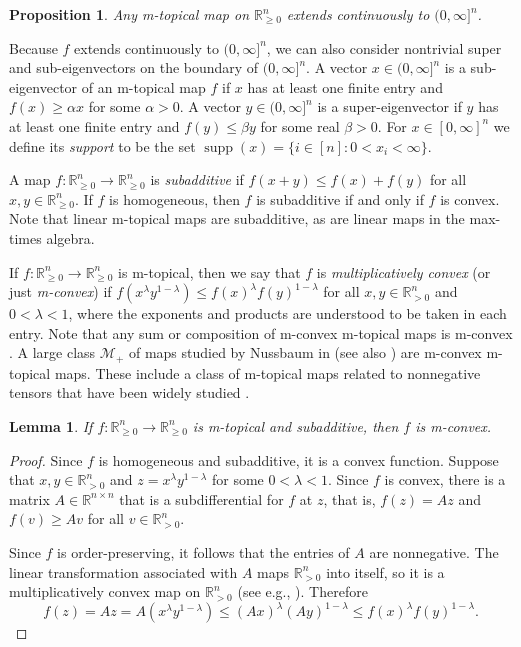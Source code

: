 \documentclass[10pt,reqno]{amsart}
\newcommand{\R}{\mathbb{R}}
\newcommand{\supp}{\operatorname{supp}}
\theoremstyle{plain}
\newtheorem{lemma}[theorem]{Lemma}
\newtheorem{proposition}[theorem]{Proposition}
\theoremstyle{definition}
\numberwithin{equation}{section}
\begin{document}
\begin{proposition} \label{prop:extend}
Any m-topical map on $\R^n_{\ge 0}$ extends continuously to $(0,\infty]^n$.
\end{proposition}

Because $f$ extends continuously to $(0,\infty]^n$, we can also consider nontrivial super and sub-eigenvectors on the boundary of $(0, \infty]^n$. A vector $x \in (0,\infty]^n$ is a sub-eigenvector of an m-topical map $f$ if $x$ has at least one finite entry and $f(x) \ge \alpha x$ for some $\alpha > 0$. A vector $y \in (0,\infty]^n$ is a super-eigenvector if $y$ has at least one finite entry and $f(y) \le \beta y$ for some real $\beta > 0$.  For $x \in [0, \infty]^n$ we define its \emph{support} to be the set $\supp(x) = \{i \in [n] : 0 <  x_i < \infty\}$. 





A map $f: \R^n_{\ge 0} \rightarrow \R^n_{\ge 0}$ is \emph{subadditive} if $f(x + y) \le f(x) + f(y)$ for all $x, y \in \R^n_{\ge 0}$.  If $f$ is homogeneous, then $f$ is subadditive if and only if $f$ is convex. Note that linear m-topical maps are subadditive, as are linear maps in the max-times algebra. 

If $f:\R^n_{\ge 0} \rightarrow \R^n_{\ge 0}$ is m-topical, then we say that $f$ is \emph{multiplicatively convex} (or just \emph{m-convex}) %
if $f(x^\lambda y^{1- \lambda}) \le f(x)^{\lambda} f(y)^{1- \lambda}$ for all $x, y \in \R^n_{>0}$ and $0 < \lambda < 1$, where the exponents and products are understood to be taken in each entry. Note that any sum or composition of m-convex m-topical maps is m-convex \cite[Lemma 4.1]{Lins23}.  A large class $\mathcal{M}_+$ of maps studied by Nussbaum in \cite{Nussbaum89} (see also \cite{LemmensNussbaum}) are m-convex m-topical maps.  These include a class of m-topical maps related to nonnegative tensors that have been widely studied \cite{ChPeZh08, FriedlandGaubertHan13, HuQi16, Lins23}.  

\begin{lemma}
If $f: \R^n_{\ge 0} \rightarrow \R^n_{\ge 0}$ is m-topical and subadditive, then $f$ is m-convex.  
\end{lemma} 

\begin{proof}
Since $f$ is homogeneous and subadditive, it is a convex function. Suppose that $x, y \in \R^n_{>0}$ and $z = x^{\lambda} y^{1-\lambda}$ for some $0< \lambda < 1$.  Since $f$ is convex, there is a matrix $A \in \R^{n \times n}$ that is a subdifferential for $f$ at $z$, that is, $f(z) = Az$ and $f(v) \ge Av$ for all $v \in \R^n_{>0}$.

Since $f$ is order-preserving, it follows that the entries of $A$ are nonnegative.  The linear transformation associated with $A$ maps $\R^n_{>0}$ into itself, so it is a multiplicatively convex map on $\R^n_{>0}$ (see e.g., \cite[Lemma 4.1]{Lins23}). Therefore 
$$f(z) = Az = A(x^\lambda y^{1-\lambda}) \le (Ax)^\lambda (Ay)^{1-\lambda} \le f(x)^\lambda f(y)^{1- \lambda}.$$
\end{proof}
\end{document}
